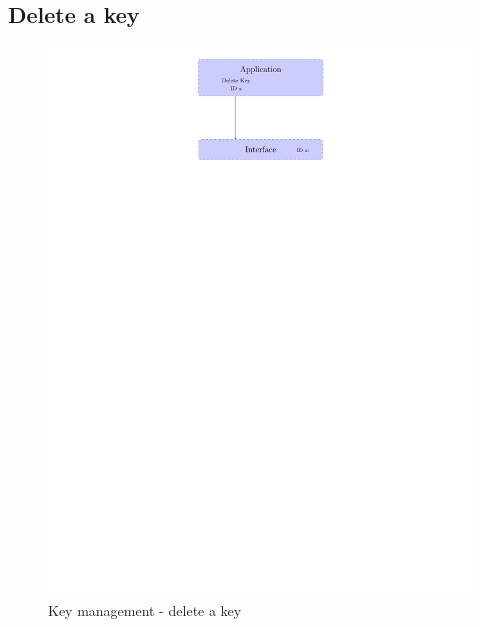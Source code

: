 \subsection*{Delete a key}
\begin{figure}[!ht]
\centering
\includegraphics[trim=12cm 22cm 9.5cm 0cm]{figures/key_manag_del_key.pdf}
\caption{Key management - delete a key\newline}
\label{fig:gci_key_mng_del}
\end{figure}
\newpage

